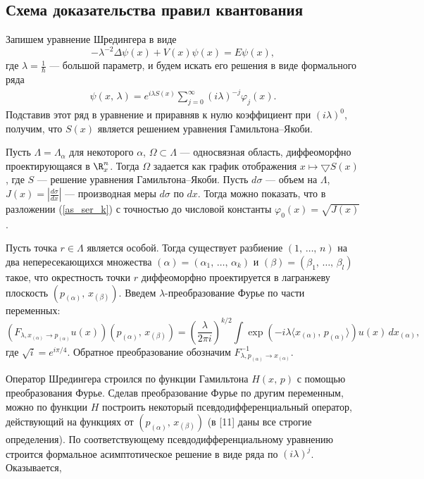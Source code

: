 \documentclass[a4paper
]{article}
\begin{document}
\subsection{Схема доказательства правил квантования}
Запишем уравнение Шредингера в виде $$-\lambda^{-2}\Delta \psi(x)+V(x)
\psi(x)=E\psi(x),$$ где $\lambda =\frac{1}{\hbar}$ --- большой параметр, и будем искать его решения
в виде формального ряда
\begin{align}
\label{as_ser_k}
\psi(x, \, \lambda)=e^{i\lambda S(x)}\sum \limits_{j=0}
^\infty (i\lambda)^{-j}\varphi_j(x).
\end{align}
Подставив этот ряд в уравнение и приравняв
к нулю коэффициент при $(i\lambda)^0$, получим, что $S(x)$ является решением
уравнения Гамильтона--Якоби. \par
Пусть $\Lambda =\Lambda _\alpha$ для некоторого $\alpha$, $\Omega \subset \Lambda$
--- односвязная область, диффеоморфно проектирующаяся в $\R^n_x$. Тогда $\Omega$
задается как график отображения $x\mapsto \bigtriangledown S(x)$, где $S$ ---
решение уравнения Гамильтона--Якоби. Пусть $d\sigma$ --- объем на $\Lambda$,
$J(x)=\left|\frac{d\sigma}{dx}\right|$ --- производная меры $d\sigma$ по $dx$.
Тогда можно показать, что в разложении (\ref{as_ser_k}) с точностью до числовой
константы $\varphi_0(x)=\sqrt{J(x)}$. \par
Пусть точка $r\in \Lambda$ является особой. Тогда существует разбиение
$(1, \, \dots, \, n)$ на два непересекающихся множества $(\alpha)=(\alpha_1, \, \dots, \,
\alpha_k)$ и $(\beta)=(\beta_1, \, \dots, \, \beta_l)$ такое, что окрестность
точки $r$ диффеоморфно проектируется в лагранжеву плоскость $(p_{(\alpha)}, \,
x_{(\beta)})$. Введем $\lambda$-преобразование Фурье по части переменных:
$$(F_{\lambda, x_{(\alpha)}\rightarrow p_{(\alpha)}}u(x))(p_{(\alpha)}, \, x_{(\beta)})
=\left(\frac{\lambda}{2\pi i}\right)^{k/2}\int \exp (-i\lambda \langle x_{(\alpha)}, \,
p_{(\alpha)}\rangle)u(x)\, dx_{(\alpha)},$$ где $\sqrt{i}=e^{i\pi /4}$. Обратное
преобразование обозначим $F^{-1}_{\lambda, p_{(\alpha)}\rightarrow x_{(\alpha)}}$. \par
Оператор Шредингера строился по функции Гамильтона $H(x, \, p)$ с помощью
преобразования Фурье. Сделав преобразование Фурье по другим переменным,
можно по функции $H$ построить некоторый псевдодифференциальный оператор,
действующий на функциях от $(p_{(\alpha)}, \, x_{(\beta)})$ (в [11] даны
все строгие определения). По соответствующему псевдодифференциальному уравнению
строится формальное асимптотическое решение в виде ряда по $(i\lambda)^j$. Оказывается,
\end{document}
